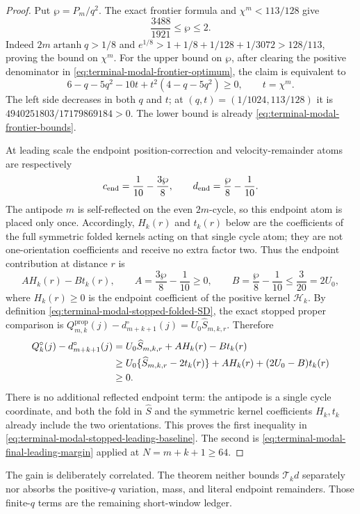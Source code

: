 \begin{proof}
Put
$\wp=P_m/q^2$.  The exact frontier formula and
$\chi^m<113/128$ give
\begin{equation}
 \frac{3488}{1921}\le\wp\le2.
 \label{eq:terminal-modal-stopped-frontier-two}
\end{equation}
Indeed $2m\operatorname{artanh}q>1/8$ and
$e^{1/8}>1+1/8+1/128+1/3072>128/113$, proving the bound on $\chi^m$.
For the upper bound on $\wp$, after clearing the positive denominator in
\eqref{eq:terminal-modal-frontier-optimum}, the claim is equivalent to
\[
 6-q-5q^2-10t+t^2(4-q-5q^2)\ge0,
 \qquad t=\chi^m.
\]
The left side decreases in both $q$ and $t$; at
$(q,t)=(1/1024,113/128)$ it is
$4940251803/17179869184>0$.  The lower bound is already
\eqref{eq:terminal-modal-frontier-bounds}.

At leading scale the endpoint position-correction and velocity-remainder
atoms are respectively
\begin{equation}
 c_{\rm end}=\frac1{10}-\frac{3\wp}{8},
 \qquad d_{\rm end}=\frac{\wp}{8}-\frac1{10}.
 \label{eq:terminal-modal-stopped-endpoint-atoms}
\end{equation}
The antipode $m$ is self-reflected on the even $2m$-cycle, so this endpoint
atom is placed only once.  Accordingly, $H_k(r)$ and $t_k(r)$ below are the
coefficients of the full symmetric folded kernels acting on that single
cycle atom; they are not one-orientation coefficients and receive no extra
factor two.  Thus the endpoint contribution at distance $r$ is
\begin{equation}
 A H_k(r)-B t_k(r),\qquad
 A=\frac{3\wp}{8}-\frac1{10}\ge0,\qquad
 B=\frac{\wp}{8}-\frac1{10}\le\frac3{20}=2U_0,
 \label{eq:terminal-modal-stopped-endpoint-response}
\end{equation}
where $H_k(r)\ge0$ is the endpoint coefficient of the positive kernel
$\mathcal H_k$.  By definition
\eqref{eq:terminal-modal-stopped-folded-SD}, the exact stopped proper
comparison is
$Q_{m,k}^{\mathrm{prop}}(j)-d_{m+k+1}^\circ(j)
=U_0\widehat S_{m,k,r}$.  Therefore
\begin{align}
 Q_k^\circ(j)-d_{m+k+1}^\circ(j)
 &=U_0\widehat S_{m,k,r}+AH_k(r)-Bt_k(r)\notag\\
 &\ge U_0\{\widehat S_{m,k,r}-2t_k(r)\}+AH_k(r)
      +(2U_0-B)t_k(r)\notag\\
 &\ge0.
\end{align}
There is no additional reflected endpoint term: the antipode is a single
cycle coordinate, and both the fold in $\widehat S$ and the symmetric
kernel coefficients $H_k,t_k$ already include the two orientations.  This
proves the first inequality in
\eqref{eq:terminal-modal-stopped-leading-baseline}.  The second is
\eqref{eq:terminal-modal-final-leading-margin} applied at
$N=m+k+1\ge64$.
\end{proof}

The gain is deliberately correlated.  The theorem neither bounds
$\mathcal T_kd$ separately nor absorbs the positive-$q$ variation, mass, and
literal endpoint remainders.  Those finite-$q$ terms are the remaining
short-window ledger.
